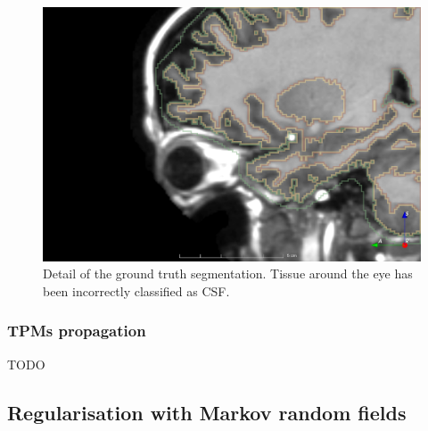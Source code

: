 \begin{figure}
  \centering
  \includegraphics[width=\textwidth]{figures/priors_manual_wrong}
  \caption{Detail of the ground truth segmentation. Tissue around the eye has been incorrectly classified as CSF.}
  \label{fig:manual-wrong}
\end{figure}




\subsubsection{TPMs propagation}

TODO




\subsection{Regularisation with Markov random fields}


